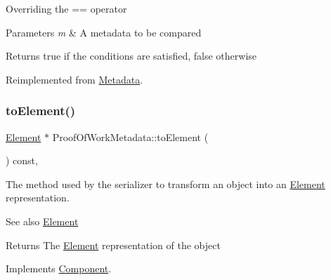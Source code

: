 Overriding the == operator


\begin{DoxyParams}{Parameters}
{\em m} & A metadata to be compared \\
\hline
\end{DoxyParams}
\begin{DoxyReturn}{Returns}
true if the conditions are satisfied, false otherwise 
\end{DoxyReturn}


Reimplemented from \mbox{\hyperlink{classMetadata_a2721356452a5d366d58275dd1fc1209c}{Metadata}}.

\mbox{\label{classProofOfWorkMetadata_a2aab4c26afb3a85a712cc065028274d9}} 
\subsubsection{\texorpdfstring{to\+Element()}{toElement()}}
{\footnotesize\ttfamily \mbox{\hyperlink{classElement}{Element}} $\ast$ Proof\+Of\+Work\+Metadata\+::to\+Element (\begin{DoxyParamCaption}{ }\end{DoxyParamCaption}) const\hspace{0.3cm}{\ttfamily [override]}, {\ttfamily [virtual]}}

The method used by the serializer to transform an object into an \mbox{\hyperlink{classElement}{Element}} representation. \begin{DoxySeeAlso}{See also}
\mbox{\hyperlink{classElement}{Element}}
\end{DoxySeeAlso}
\begin{DoxyReturn}{Returns}
The \mbox{\hyperlink{classElement}{Element}} representation of the object 
\end{DoxyReturn}


Implements \mbox{\hyperlink{classComponent_a3e63d8c993e417a4af3f56d65ebfc7ea}{Component}}.

\mbox{\label{classProofOfWorkMetadata_add9667954ffeaee75f3329c6c832e8b7}} 
